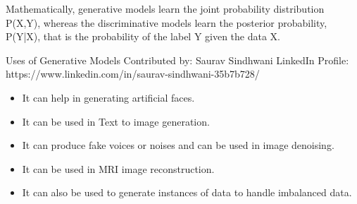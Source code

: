 
Mathematically, generative models learn the joint probability distribution P(X,Y), whereas the discriminative models learn the posterior probability, P(Y|X), that is the probability of the label Y given the data X.



Uses of Generative Models
Contributed by: Saurav Sindhwani
LinkedIn Profile: https://www.linkedin.com/in/saurav-sindhwani-35b7b728/

\begin{itemize}
	\item It can help in generating artificial faces.
	\item It can be used in Text to image generation.
	\item It can produce fake voices or noises and can be used in image denoising.
	\item It can be used in MRI image reconstruction.
	\item It can also be used to generate instances of data to handle imbalanced data.
\end{itemize}

